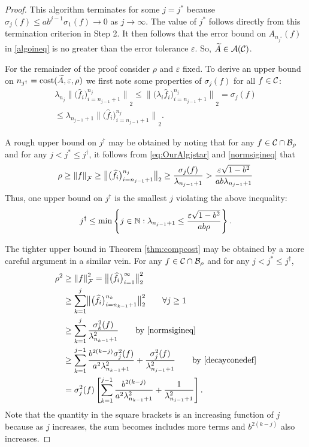 \documentclass[graybox,footinfo]{svmult}
\newcommand{\DHJRnorm}[2][{}]{\ensuremath{\left \lVert #2 \right \rVert}_{#1}}
\newcommand{\DHJRbignorm}[2][{}]{\ensuremath{\bigl \lVert #2 \bigr \rVert}_{#1}}
\begin{document}
\begin{proof}
This algorithm terminates for some $j = j^*$ because $\sigma_j(f) \le ab^{j-1} \sigma_{1}(f) \to 0$ as $j \to \infty$. The value of $j^*$ follows directly from this termination criterion in Step 2.  It then follows that the error bound on $A_{n_{j^*}}(f)$ in \eqref{algoineq} is no greater than the error tolerance $\varepsilon$.  So, $\widetilde{A} \in {\mathcal{A}}({\mathcal{C}})$.

For the remainder of the proof consider $\rho$ and $\varepsilon$ fixed.  To derive an upper bound on $n_{j^\dagger} = \textup{cost}(\widetilde{A},\varepsilon,\rho)$ we first note some properties of $\sigma_j(f)$ for all $f \in {\mathcal{C}}$:
\begin{multline} \label{normsigineq}
\lambda_{n_j} \DHJRbignorm[2]{\big( \widehat{f}_i \big)_{i=n_{j-1}+1}^{n_j}} \le 
\DHJRbignorm[2]{\big( \lambda_i \widehat{f}_i \big)_{i=n_{j-1}+1}^{n_j}} = \sigma_j(f) 
\\
\le \lambda_{n_{j-1}+1} \DHJRbignorm[2]{\big( \widehat{f}_i \big)_{i=n_{j-1}+1}^{n_j}}.
\end{multline}

A rough upper bound on $j^\dagger$ may be obtained by noting that for any $f \in {\mathcal{C}} \cap {\mathcal{B}}_\rho$ and for any $j < j^* \le j^\dagger$, it follows from \eqref{eq:OurAlgjstar} and \eqref{normsigineq} that 
\begin{equation*}
\rho \ge \DHJRnorm[\calF]{f} \ge \DHJRbignorm[2]{\big( \widehat{f}_i \big)_{i=n_{j-1}+1}^{n_j}} \ge \frac{\sigma_j(f)}{\lambda_{n_{j-1}+1}} > \frac{\varepsilon\sqrt{1 - b^2}}{ab \lambda_{n_{j-1}+1}}
\end{equation*}
Thus, one upper bound on $j^\dagger$ is the smallest $j$ violating the above inequality:
\begin{equation} \label{jdaggerlast}
j^\dagger \le \min \left \{j \in \bbN :  \lambda_{n_{j-1}+1} \le \frac{\varepsilon\sqrt{1 - b^2}}{ab \rho} \right\}.
\end{equation}

The tighter upper bound in Theorem \ref{thm:compcost} may be obtained by a more careful argument in a similar vein.  
For any $f \in  {\mathcal{C}} \cap {\mathcal{B}}_\rho$ and for any $j < j^* \le j^\dagger$,
\begin{align*}
\rho^2 &\ge \DHJRnorm[\calF]{f}^2 = \DHJRbignorm[2]{\big( \widehat{f}_i \big)_{i=1}^{\infty}}^2 \\
& \ge \sum_{k=1}^j \DHJRbignorm[2]{\big( \widehat{f}_i \big)_{i=n_{k-1}+1}^{n_k}}^2 \qquad \forall j \ge 1\\
& \ge \sum_{k=1}^j \frac{\sigma_k^2(f)}{\lambda_{n_{k-1}+1}^2} \qquad \text{by \eqref{normsigineq}}\\
& \ge \sum_{k=1}^{j-1} \frac{ b^{2(k-j)}\sigma_j^2(f)}{a^{2}\lambda_{n_{k-1}+1}^2} + \frac{\sigma_j^2(f)}{\lambda_{n_{j-1}+1}^2} \qquad \text{by \eqref{decayconedef}} \\
& = \sigma_j^2(f) \left[ \sum_{k=1}^{j-1} \frac{b^{2(k-j)}}{a^{2} \lambda_{n_{k-1}+1}^2} + \frac{1}{\lambda_{n_{j-1}+1}^2}\right].
\end{align*}
Note that the quantity in the square brackets is an increasing function of $j$ because as $j$ increases, the sum becomes includes more terms and $b^{2(k-j)}$ also increases.


\end{proof}
\end{document}
